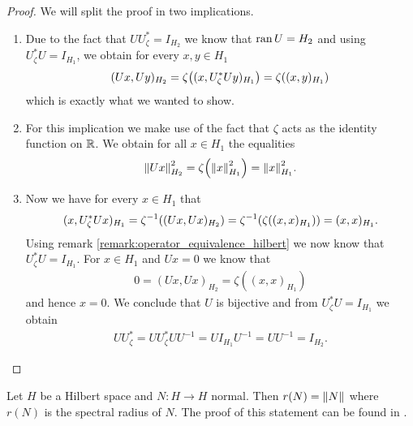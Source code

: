 \begin{proof}
	We will split the proof in two implications.
	\begin{enumerate}
		\item[\Quote{$(\mathrm{i}) \Rightarrow \ (\mathrm{ii})$}] Due to the fact that $U U_\zeta^\ast = I_{H_2}$ we know that $\ran U = H_2$ and using $U_\zeta^\ast U = I_{H_1}$, we obtain for every $x,y \in H_1$ 
		\begin{align*}
			(Ux, Uy)_{H_2} = \zeta\pbraces{(x, U_\zeta^\ast U y)_{H_1}} = \zeta \pbraces{(x,y)_{H_1}}
		\end{align*}
		which is exactly what we wanted to show.
		
		\item[\Quote{$(\mathrm{ii}) \Rightarrow \ (\mathrm{iii})$}] For this implication we make use of the fact that $\zeta$ acts as the identity function on $\R$. We obtain for all $x \in H_1$ the equalities
		\begin{align*}
			\norm[H_2]{Ux}^2 = \zeta\pbraces{\norm[H_1]{x}^2} = \norm[H_1]{x}^2.
		\end{align*} 
		
		\item[\Quote{$(\mathrm{iii}) \Rightarrow \ (\mathrm{i})$}] Now we have for every $x \in H_1$ that 
		\begin{align*}
			(x, U_\zeta^\ast U x)_{H_1} = \zeta^{-1}\pbraces{(Ux, Ux)_{H_2}} = \zeta^{-1}\pbraces{\zeta\pbraces{(x,x)_{H_1}}} = (x,x)_{H_1}.
		\end{align*}
		Using remark \ref{remark:operator_equivalence_hilbert} we now know that $U_\zeta^\ast U = I_{H_1}$. For $x \in H_1$ and $Ux = 0$ we know that 
		\begin{align*}
			0 = (Ux, Ux)_{H_2} = \zeta((x,x)_{H_1})
		\end{align*}
		and hence $x = 0$. We conclude that $U$ is bijective and from $U_\zeta^\ast U = I_{H_1}$ we obtain
		\begin{align*}
			U U_\zeta^\ast = U U_\zeta^\ast UU^{-1} = UI_{H_1}U^{-1} = UU^{-1} = I_{H_2}.
		\end{align*}
	\end{enumerate}
\end{proof}


\begin{remark} \label{remark:spectral_radius}
	Let $H$ be a Hilbert space and $N: H \to H$ normal. Then $r(N) = \norm{N}$ where $r(N)$ is the spectral radius of $N$. The proof of this statement can be found in \cite[p.142]{FAna1}.
\end{remark}


